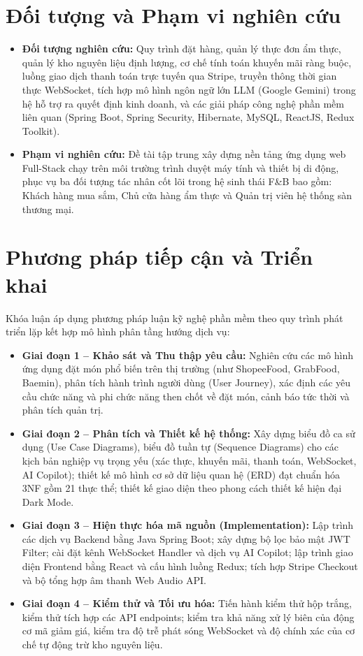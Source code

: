 \documentclass{uetgraduation}
\begin{document}
\section{Đối tượng và Phạm vi nghiên cứu}
\begin{itemize}
    \item \textbf{Đối tượng nghiên cứu:} Quy trình đặt hàng, quản lý thực đơn ẩm thực, quản lý kho nguyên liệu định lượng, cơ chế tính toán khuyến mãi ràng buộc, luồng giao dịch thanh toán trực tuyến qua Stripe, truyền thông thời gian thực WebSocket, tích hợp mô hình ngôn ngữ lớn LLM (Google Gemini) trong hệ hỗ trợ ra quyết định kinh doanh, và các giải pháp công nghệ phần mềm liên quan (Spring Boot, Spring Security, Hibernate, MySQL, ReactJS, Redux Toolkit).
    \item \textbf{Phạm vi nghiên cứu:} Đề tài tập trung xây dựng nền tảng ứng dụng web Full-Stack chạy trên môi trường trình duyệt máy tính và thiết bị di động, phục vụ ba đối tượng tác nhân cốt lõi trong hệ sinh thái F\&B bao gồm: Khách hàng mua sắm, Chủ cửa hàng ẩm thực và Quản trị viên hệ thống sàn thương mại.
\end{itemize}

\section{Phương pháp tiếp cận và Triển khai}
Khóa luận áp dụng phương pháp luận kỹ nghệ phần mềm theo quy trình phát triển lặp kết hợp mô hình phân tầng hướng dịch vụ:
\begin{itemize}
    \item \textbf{Giai đoạn 1 -- Khảo sát và Thu thập yêu cầu:} Nghiên cứu các mô hình ứng dụng đặt món phổ biến trên thị trường (như ShopeeFood, GrabFood, Baemin), phân tích hành trình người dùng (User Journey), xác định các yêu cầu chức năng và phi chức năng then chốt về đặt món, cảnh báo tức thời và phân tích quản trị.
    \item \textbf{Giai đoạn 2 -- Phân tích và Thiết kế hệ thống:} Xây dựng biểu đồ ca sử dụng (Use Case Diagrams), biểu đồ tuần tự (Sequence Diagrams) cho các kịch bản nghiệp vụ trọng yếu (xác thực, khuyến mãi, thanh toán, WebSocket, AI Copilot); thiết kế mô hình cơ sở dữ liệu quan hệ (ERD) đạt chuẩn hóa 3NF gồm 21 thực thể; thiết kế giao diện theo phong cách thiết kế hiện đại Dark Mode.
    \item \textbf{Giai đoạn 3 -- Hiện thực hóa mã nguồn (Implementation):} Lập trình các dịch vụ Backend bằng Java Spring Boot; xây dựng bộ lọc bảo mật JWT Filter; cài đặt kênh WebSocket Handler và dịch vụ AI Copilot; lập trình giao diện Frontend bằng React và cấu hình luồng Redux; tích hợp Stripe Checkout và bộ tổng hợp âm thanh Web Audio API.
    \item \textbf{Giai đoạn 4 -- Kiểm thử và Tối ưu hóa:} Tiến hành kiểm thử hộp trắng, kiểm thử tích hợp các API endpoints; kiểm tra khả năng xử lý biên của động cơ mã giảm giá, kiểm tra độ trễ phát sóng WebSocket và độ chính xác của cơ chế tự động trừ kho nguyên liệu.
\end{itemize}
\end{document}

